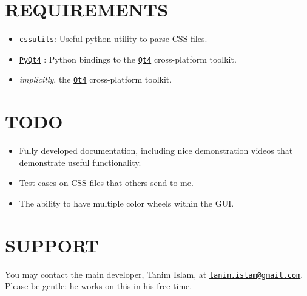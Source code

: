 \documentclass[]{article}
\begin{document}
\section{REQUIREMENTS}\label{requirements}
\begin{itemize}
  \item \href{http://pythonhosted.org/cssutils/}{\texttt{cssutils}}:
    Useful python utility to parse CSS files.
  \item
    \href{https://www.riverbankcomputing.com/software/pyqt/intro}{\texttt{PyQt4}}
    : Python bindings to the
    \href{http://doc.qt.io/qt-4.8/index.html}{\texttt{Qt4}}
    cross-platform toolkit.
  \item\textit{implicitly}, the \href{http://doc.qt.io/qt-4.8/index.html}{\texttt{Qt4}}
    cross-platform toolkit.
\end{itemize}

\section{TODO}\label{todo}
\begin{itemize}
  \item Fully developed documentation, including nice demonstration
    videos that demonstrate useful functionality.
  \item Test cases on CSS files that others send to me.
  \item The ability to have multiple color wheels within the GUI.
\end{itemize}

\section{SUPPORT}\label{support}
You may contact the main developer, Tanim Islam, at
\href{mailto:tanim.islam@gmail.com}{\texttt{tanim.islam@gmail.com}}. Please
be gentle; he works on this in his free time.
\end{document}
